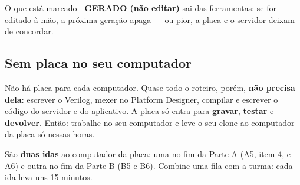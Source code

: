 \documentclass[11pt,a4paper,oneside]{article}
\newcommand{\arq}[1]{{\upshape\ttfamily\detokenize{#1}}}
\newcommand{\gera}{\textcolor{cinza}{\sffamily\bfseries\scriptsize\ GERADO (não editar)}}
\begin{document}
O que está marcado \gera{} sai das ferramentas: se for editado à mão, a
próxima geração apaga --- ou pior, a placa e o servidor deixam de concordar.

\subsection*{Sem placa no seu computador}

Não há placa para cada computador. Quase todo o roteiro, porém, \textbf{não
precisa dela}: escrever o Verilog, mexer no Platform Designer, compilar e
escrever o código do servidor e do aplicativo. A placa só entra para
\textbf{gravar}, \textbf{testar} e \textbf{devolver}. Então: trabalhe no seu
computador e leve o seu clone ao computador da placa só nessas horas.

\begin{center}
\end{center}

São \textbf{duas idas} ao computador da placa: uma no fim da Parte A (A5,
item 4, e A6) e outra no fim da Parte B (B5 e B6). Combine uma fila com a
turma: cada ida leva uns 15 minutos.
\end{document}
